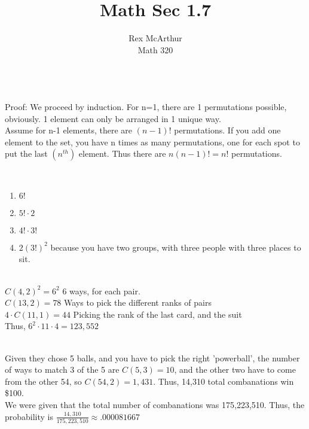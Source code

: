 \documentclass[letterpaper,12pt]{article}
\title{Math Sec 1.7}
\author{Rex McArthur\\Math 320}
\theoremstyle{definition}
\begin{document}
\maketitle
{}\\
Proof: We proceed by induction. For n=1, there are 1 permutations possible, 
obviously. 1 element can only be arranged in 1 unique way.\\
Assume for n-1 elements, there are $(n-1)!$ permutations. If you add one
element to the set, you have n times as many permutations, one for each 
spot to put the last $(n^{th})$ element. Thus there are $n(n-1)! = n!$ 
permutations.

\\
\begin{enumerate}
    \item $6!$
    \item $5!\cdot2$
    \item $4!\cdot3!$
    \item $2(3!)^2$ because you have two groups, with three people with 
        three places to sit.
\end{enumerate}

\\
$C(4,2)^2 = 6^2$ 6 ways, for each pair. \\
$C(13,2) = 78$ Ways to pick the different ranks of pairs\\
$4 \cdot C(11,1) = 44$ Picking the rank of the last card, and the suit\\
Thus, $6^2\cdot 11\cdot 4 = 123,552$

\\
Given they chose 5 balls, and you have to pick the right 'powerball', 
the number of ways to match 3 of the 5 are $C(5,3) = 10$, 
and the other two have to come from the other 54, so $C(54,2) = 1,431$. 
Thus, 14,310 total combanations win \$100. \\
We were given that the total number of combanations was 175,223,510. Thus,
the probability is $\frac{14,310}{175,223,510} \approx .000081667$
\end{document}
